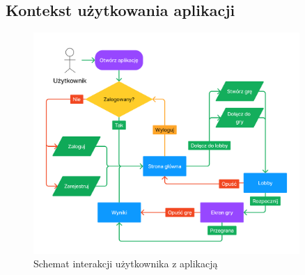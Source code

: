 \chapter{\ChapterTitleScope}
\label{sec:zakres-funkcjonalnosci}


\section{Kontekst użytkowania aplikacji}

\begin{figure}[b!]
  \centering
  \includegraphics[width=0.9\textwidth]{img/flow-aplikacji/user_flow.png}
  \caption{Schemat interakcji użytkownika z aplikacją}
  \label{fig:figma_userflow}
\end{figure}

